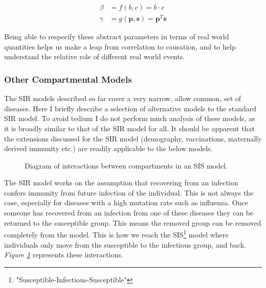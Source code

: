 \documentclass[11pt,a4paper]{article}
\theoremstyle{break}
\begin{document}
  \begin{subequations}\label{eqn_alt_parameters}
    \begin{alignat}{2}
      \beta&=f(b,c)=b\cdot c\label{eqn_alt_beta}\\
      \gamma&=g(\mathbf{p},\mathbf{s})=\mathbf{p}^T\mathbf{s}\label{eqn_alt_gamma}
    \end{alignat}
  \end{subequations}

  \par Being able to respecify these abstract parameters in terms of real world quantities helps us make a leap from correlation to causation, and to help understand the relative role of different real world events.

\subsubsection{Other Compartmental Models}\label{sec_other_compartmental_models}

  \par The SIR models described so far cover a very narrow, allow common, set of diseases. Here I briefly describe a selection of alternative models to the standard SIR model. To avoid tedium I do not perform much analysis of these models, as it is broadly similar to that of the SIR model for all. It should be apparent that the extensions discussed for the SIR model (demography, vaccinations, maternally derived immunity etc.) are readily applicable to the below models.

  \begin{figure}[H]
    \centering
    \caption{Diagram of interactions between compartments in an SIS model.}
    \label{fig_sis_model_diagram}
  \end{figure}

  \par The SIR model works on the assumption that recovering from an infection confers immunity from future infection of the individual. This is not always the case, especially for diseases with a high mutation rate such as influenza. Once someone has recovered from an infection from one of these diseases they can be returned to the susceptible group. This means the removed group can be removed completely from the model. This is how we reach the SIS\footnote{"Susceptible-Infectious-Susceptible"} model where individuals only move from the susceptible to the infectious group, and back. \textit{Figure \ref{fig_sis_model_diagram}} represents these interactions.
\end{document}
